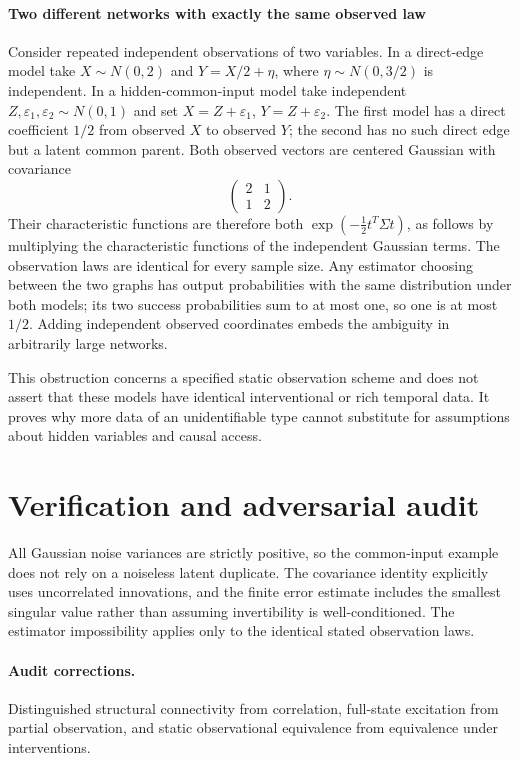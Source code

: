 \documentclass[11pt]{article}
\begin{document}
\paragraph{Two different networks with exactly the same observed law}
Consider repeated independent observations of two variables. In a direct-edge model take $X\sim N(0,2)$ and $Y=X/2+\eta$, where $\eta\sim N(0,3/2)$ is independent. In a hidden-common-input model take independent $Z,\varepsilon_1,\varepsilon_2\sim N(0,1)$ and set $X=Z+\varepsilon_1$, $Y=Z+\varepsilon_2$. The first model has a direct coefficient $1/2$ from observed $X$ to observed $Y$; the second has no such direct edge but a latent common parent. Both observed vectors are centered Gaussian with covariance
\[
 \begin{pmatrix}2&1\\1&2\end{pmatrix}.
\]
Their characteristic functions are therefore both $\exp(-\tfrac12 t^T\Sigma t)$, as follows by multiplying the characteristic functions of the independent Gaussian terms. The observation laws are identical for every sample size. Any estimator choosing between the two graphs has output probabilities with the same distribution under both models; its two success probabilities sum to at most one, so one is at most $1/2$. Adding independent observed coordinates embeds the ambiguity in arbitrarily large networks.

This obstruction concerns a specified static observation scheme and does not assert that these models have identical interventional or rich temporal data. It proves why more data of an unidentifiable type cannot substitute for assumptions about hidden variables and causal access.

\section{Verification and adversarial audit}
All Gaussian noise variances are strictly positive, so the common-input example does not rely on a noiseless latent duplicate. The covariance identity explicitly uses uncorrelated innovations, and the finite error estimate includes the smallest singular value rather than assuming invertibility is well-conditioned. The estimator impossibility applies only to the identical stated observation laws.
\paragraph{Audit corrections.} Distinguished structural connectivity from correlation, full-state excitation from partial observation, and static observational equivalence from equivalence under interventions.
\end{document}
